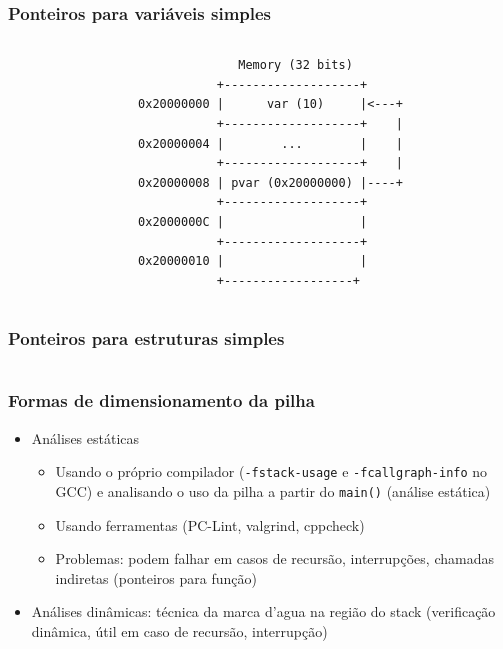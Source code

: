 \documentclass{beamer}
\begin{document}
\begin{frame}[fragile]
	\frametitle{Ponteiros para variáveis simples}
	\begin{columns}[T] %
	\begin{column}{.50\textwidth}
		
	\end{column}%
	\hfill%
	\begin{column}{.50\textwidth}
	 {\tiny
	\begin{verbatim}
              Memory (32 bits)
           +-------------------+
0x20000000 |      var (10)     |<---+
           +-------------------+    |
0x20000004 |        ...        |    |
           +-------------------+    |
0x20000008 | pvar (0x20000000) |----+
           +-------------------+
0x2000000C |                   |
           +-------------------+
0x20000010 |                   |
           +------------------+
	\end{verbatim}
}

	\end{column}%
\end{columns}
\end{frame}

\begin{frame}[fragile]
	\frametitle{Ponteiros para estruturas simples}
	\begin{columns}[T] %
	\begin{column}{.75\textwidth}
		
	\end{column}%
	\hfill%
	\begin{column}{.25\textwidth}
	\end{column}%
\end{columns}
\end{frame}

\begin{frame}
	\frametitle{Formas de dimensionamento da pilha}
	\begin{itemize}
		\item Análises estáticas
		\begin{itemize}
			\item Usando o próprio compilador (\texttt{-fstack-usage} e \texttt{-fcallgraph-info} no GCC) e analisando o uso da pilha a partir do \texttt{main()} (análise estática)
			\item Usando ferramentas (PC-Lint, valgrind, cppcheck)
			\item Problemas: podem falhar em casos de recursão, interrupções, chamadas indiretas (ponteiros para função)
		\end{itemize}
		\item Análises dinâmicas: técnica da marca d'agua na região do stack (verificação dinâmica, útil em caso de recursão, interrupção)
		\end{itemize}
\end{frame}
\end{document}
